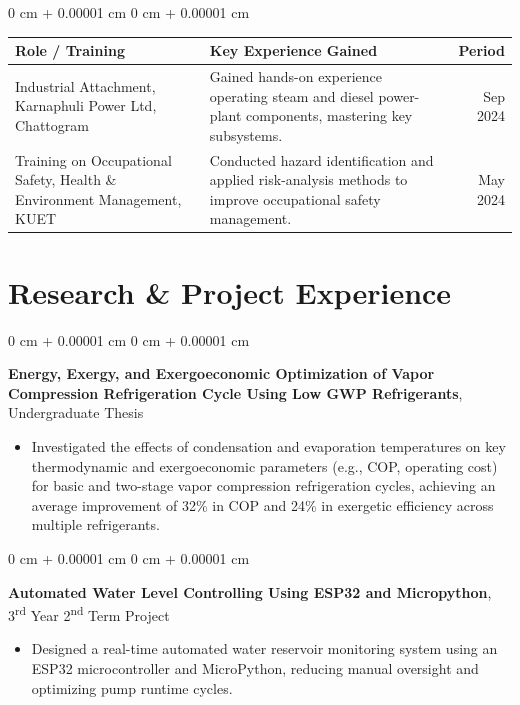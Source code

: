 \documentclass[10pt, letterpaper]{article}
\newenvironment{highlightsforbulletentries}{
  \begin{itemize}[
        topsep=2pt,
        parsep=0pt,
        partopsep=0pt,
        itemsep=0pt,
        leftmargin=10pt
      ]
    }{
  \end{itemize}
} %
\newenvironment{onecolentry}{
  \begin{adjustwidth}{
      0 cm + 0.00001 cm
    }{
      0 cm + 0.00001 cm
    }
  }{
  \end{adjustwidth}
} %
\begin{document}
\begin{onecolentry}
  \begin{tabularx}{\textwidth}{@{} X p{8.7cm} r @{}}
    \textbf{Role / Training} & \textbf{Key
    Experience Gained} & \textbf{Period}  \\
    \midrule
    Industrial Attachment, Karnaphuli Power Ltd, Chattogram &
    Gained hands-on experience operating steam and diesel power-plant
    components, mastering key subsystems. &
    Sep 2024 \\
    \addlinespace
    Training on Occupational Safety, Health \& Environment
    Management, KUET &
    Conducted hazard identification and applied risk-analysis methods
    to improve occupational safety management. &
    May 2024 \\
    \midrule
  \end{tabularx}
\end{onecolentry}


\section{Research \& Project Experience}

\begin{onecolentry}
  \textbf {Energy, Exergy, and Exergoeconomic Optimization of Vapor Compression
  Refrigeration Cycle Using Low GWP Refrigerants}, Undergraduate Thesis

  \begin{highlightsforbulletentries}
  \item Investigated the effects of condensation and evaporation
    temperatures on key thermodynamic and exergoeconomic parameters
    (e.g., COP, operating cost) for basic and two-stage vapor
    compression refrigeration cycles, achieving an average
    improvement of 32\% in COP and 24\% in exergetic efficiency across
    multiple refrigerants.
  \end{highlightsforbulletentries}
\end{onecolentry}

\begin{onecolentry}
  \textbf{Automated Water Level Controlling Using ESP32 and Micropython},
  3\textsuperscript{rd} Year 2\textsuperscript{nd} Term Project

  \begin{highlightsforbulletentries}
  \item Designed a real-time automated water reservoir monitoring
    system using an ESP32 microcontroller and MicroPython, reducing
    manual oversight and optimizing pump runtime cycles.
  \end{highlightsforbulletentries}
\end{onecolentry}
\end{document}
